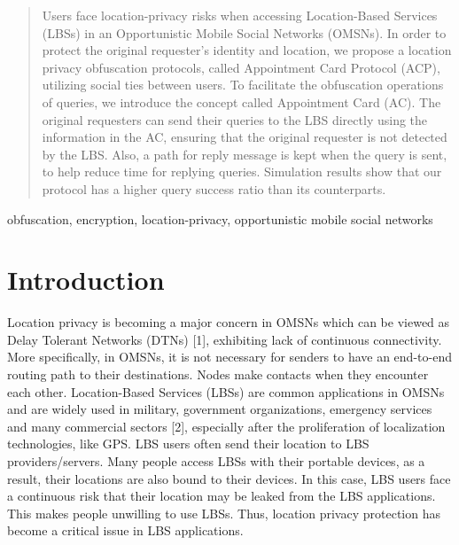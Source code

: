 \documentclass[conference]{IEEEtran}
\begin{document}
\begin{abstract}

Users face location-privacy risks when accessing Location-Based Services (LBSs) in an Opportunistic Mobile Social Networks (OMSNs). In order to protect the original requester's identity and location, we propose a location privacy obfuscation protocols, called Appointment Card Protocol (ACP), utilizing social ties between users. To facilitate the obfuscation operations of queries, we introduce the concept called Appointment Card (AC). The original requesters can send their queries to the LBS directly using the information in the AC, ensuring that the original requester is not detected by the LBS. Also, a path for reply message is kept when the query is sent, to help reduce time for replying queries. Simulation results show that our protocol has a higher query success ratio than its counterparts.

\end{abstract}

\begin{IEEEkeywords}
obfuscation, encryption, location-privacy, opportunistic mobile social networks
\end{IEEEkeywords}

\section{Introduction}

Location privacy is becoming a major concern in OMSNs which can be viewed as Delay Tolerant Networks (DTNs) [1], exhibiting lack of continuous connectivity. More specifically, in OMSNs, it is not necessary for senders to have an end-to-end routing path to their destinations. Nodes make contacts when they encounter each other. Location-Based Services (LBSs) are common applications in OMSNs and are widely used in military,  government organizations, emergency services and many commercial sectors [2], especially after the proliferation of localization technologies, like GPS. LBS users often send their location to LBS providers/servers. Many people access LBSs with their portable devices, as a result, their locations are also bound to their devices. In this case, LBS users face a continuous risk that their location may be leaked from the LBS applications. This makes people unwilling to use LBSs. Thus, location privacy protection has become a critical issue in LBS applications. 
\end{document}
